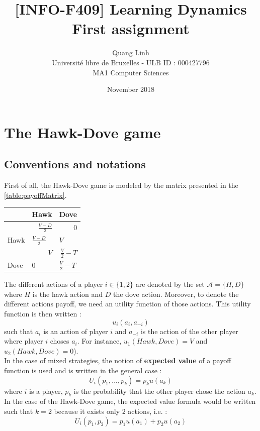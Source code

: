 \documentclass{article}
\title{[INFO-F409] Learning Dynamics \\ First assignment}
\author{\bsc{BUI QUANG PHUONG} Quang Linh \\ Université libre de Bruxelles - ULB ID : 000427796  \\ MA1 Computer Sciences}
\date{November 2018}
\begin{document}
\maketitle

\tableofcontents

\newpage
\section{The Hawk-Dove game}

\subsection*{Conventions and notations}
First of all, the Hawk-Dove game is modeled by the matrix presented in the \autoref{table:payoffMatrix}. 

\begin{center}
\begin{tabular}{|l|r|r|}
  \hline
  			   & Hawk & Dove \\
  \hline
  		   & \hspace{1cm} $\frac{V-D}{2}$ & 0 \\
  	Hawk &	\multicolumn{1}{|l|}{$\frac{V-D}{2}$}		& 	\multicolumn{1}{|l|}{$V$ }		\\
  \hline
    		   & \multicolumn{1}{|r|}{$V$} & \hspace{1cm} $\frac{V}{2}-T$  \\
  Dove &	\multicolumn{1}{|l|}{0}		& 	\multicolumn{1}{|l|}{$\frac{V}{2}-T$}		\\
  \hline
\end{tabular}
\label{table:payoffMatrix}
\end{center}

The different actions of a player $i \in \{1,2\}$ are denoted by the set $\mathcal{A} = \{H,D\}$ where $H$ is the hawk action and  
$D$ the dove action. Moreover, to denote the different actions payoff, we need an utility function of those actions. This utility function is then written  : 
$$ u_{i}(a_{i}, a_{-i}) $$ such that $a_{i}$ is an action of player $i$ and $a_{-i}$ is the action of the other player where player $i$ choses $a_{i}$. For instance,  $ u_{1}(Hawk, Dove) = V $ and $ u_{2}(Hawk, Dove) = 0 $). \\

In the case of mixed strategies, the notion of \textbf{expected value} of a payoff function is used and is written in the general case :
$$ U_{i}(p_{1}, ... , p_{k }) = p_{k} u(a_{k})$$ where $i$ is a player, $p_{k}$ is the probability that the other player chose the action $a_{k}$. 
In the case of the Hawk-Dove game, the expected value formula would be written such that $k=2$ because it exists only 2 actions, i.e. :  $$ U_{i}(p_{1}, p_{2}) = p_{1} u(a_{1}) + p_{2} u(a_{2})$$
\end{document}
